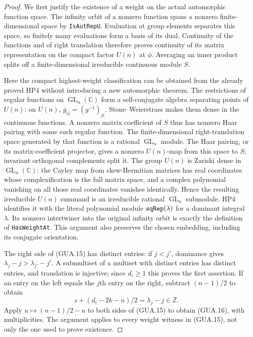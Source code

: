 \documentclass[11pt,a4paper]{article}
\numberwithin{equation}{section}
\theoremstyle{remark}\newtheorem{remark}[theorem]{Remark}
\begin{document}
\begin{proof}
We first justify the existence of a weight on the actual
automorphic function space.  The infinity orbit of a
nonzero function spans a nonzero finite-dimensional space
by \texttt{Is\allowbreak Aut\allowbreak Rep\allowbreak U}.  Evaluation at group elements
separates this space, so finitely many evaluations form
a basis of its dual.  Continuity of the functions and
of right translation therefore proves continuity of
its matrix representation on the compact factor
$U(n)$ at $\phi$.  Averaging an inner product splits
off a finite-dimensional irreducible continuous module $S$.

Here the compact highest-weight classification can be
obtained from the already proved HP4 without introducing
a new automorphic theorem.  The restrictions of regular
functions on $\operatorname{GL}_n(\mathbb C)$ form a
self-conjugate algebra separating points of $U(n)$:
on $U(n)$, $\overline{g}_{ij}=(g^{-1})_{ji}$.
Stone--Weierstrass makes them dense in the continuous
functions.  A nonzero matrix coefficient of $S$ thus
has nonzero Haar pairing with some such regular function.
The finite-dimensional right-translation space generated
by that function is a rational $\operatorname{GL}_n$
module.  The Haar pairing, or its matrix-coefficient
projector, gives a nonzero $U(n)$-map from this space
to $S$; invariant orthogonal complements split it.
The group $U(n)$ is Zariski dense in
$\operatorname{GL}_n(\mathbb C)$: the Cayley map from
skew-Hermitian matrices has real coordinates whose
complexification is the full matrix space, and a complex
polynomial vanishing on all those real coordinates
vanishes identically.  Hence the resulting irreducible
$U(n)$ summand is an irreducible rational
$\operatorname{GL}_n$ submodule.  HP4 identifies it
with the literal polynomial module
$\texttt{sq\allowbreak Rep}(\lambda)$ for a dominant integral
$\lambda$.  Its nonzero intertwiner into the original
infinity orbit is exactly the definition of
\texttt{Has\allowbreak Weight\allowbreak At}.  This argument also preserves
the chosen embedding, including its conjugate orientation.

The right side of (GUA.15) has distinct entries:
if $j<j'$, dominance gives
$\lambda_j-j>\lambda_{j'}-j'$.  A submultiset of a
multiset with distinct entries has distinct entries,
and translation is injective; since $d_i\geq1$ this
proves the first assertion.  If an entry on the left
equals the $j$th entry on the right, subtract
$(n-1)/2$ to obtain
\[
          z+(d_i-2k-n)/2=\lambda_j-j\in\mathbb Z.
\]
Apply $u\mapsto(n-1)/2-u$ to both sides of
(GUA.15) to obtain (GUA.16), with multiplicities.
The argument applies to every weight witness in
(GUA.15), not only the one used to prove existence.
\end{proof}
\end{document}
